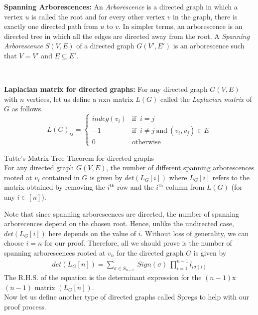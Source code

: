\begin{definition}\textbf{Spanning Arborescences:} An \textit{Arborescence} is a directed graph in which a vertex $u$ is called the root and for every other vertex $v$ in the graph, there is exactly one directed path from $u$ to $v$. In simpler terms, an arborescence is an directed tree in which all the edges are directed away from the root. A \textit{Spanning Arborescence} $S(V,E)$ of a directed graph $G(V',E')$ is an arborescence such that $V=V'$ and $E\subseteq E'$.
\end{definition}
\noindent\\
\begin{definition}\textbf{Laplacian matrix for directed graphs:} For any directed graph $G(V,E)$ with $n$ vertices, let us define a $n$x$n$ matrix $L(G)$ called the \textit{Laplacian matrix} of $G$ as follows.
\[
  L(G)_{ij} = 
  \begin{cases}
    indeg(v_i) &\mbox{if }~ i = j\\
    -1 &\mbox{if }~ i \neq j ~\text{and}~(v_i,v_j)\in E\\
    0 &\mbox{otherwise}
  \end{cases}
\]
\end{definition}
\begin{theorem} Tutte's Matrix Tree Theorem for directed graphs\\
For any directed graph $G(V,E)$, the number of different spanning arborescences rooted at $v_i$ contained in $G$ is given by $det(L_G[i])$ where $L_G[i]$ refers to the matrix obtained by removing the $i^{\text{th}}$ row and the $i^{\text{th}}$ column from $L(G)$ (for any $i \in [n]$).
\end{theorem}
\noindent
Note that since spanning arborescences are directed, the number of spanning arborecences depend on the chosen root. Hence, unlike the undirected case, $det(L_G[i])$ here depends on the value of $i$. Without loss of generality, we can choose $i = n$ for our proof. Therefore, all we should prove is the number of spanning arborescences rooted at $v_n$ for the directed graph $G$ is given by
\begin{align}
    det(L_G[n]) = \sum_{\sigma \in S_{n-1}}~
    Sign(\sigma)~\prod_{i=1}^{n-1}l_{i\sigma(i)}
    \label{eq:to_prove:Tutte}
\end{align} 
The R.H.S. of the equation is the determinant expression for the $(n-1)$x$(n-1)$ matrix $(L_G[n])$.\\Now let us define another type of directed graphs called Spregs to help with our proof process.\\
